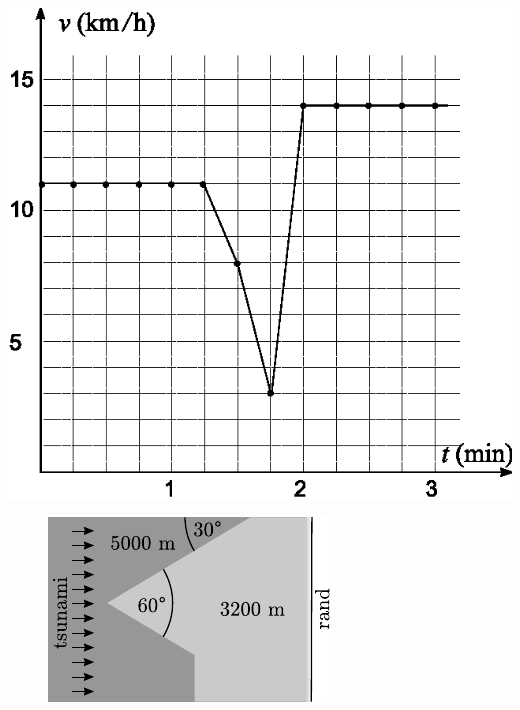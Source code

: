 \documentclass[10pt]{article}
\begin{document}
{\begin{center}
\includegraphics{2009-v3g-05-gps.eps}
\end{center}
\probend
\bigskip


\begin{figure}
	\begin{center}
		\vspace{-20pt}
		\includegraphics[width=\linewidth]{2005-v3g-06-yl}
	\end{center}
\end{figure}

}
\end{document}
